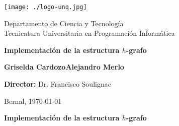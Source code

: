 \documentclass[%
    a4paper,%
    12pt,%
    twoside,%
    openright,%
    halfparskip,%
    cleardoubleempty,%
    bigheadings,%
    titlepage,%
    headsepline%
]{scrbook}
\begin{document}

\frontmatter
\begin{titlepage}


\begin{center}
\texttt{[image: ./logo-unq.jpg]}\\

\medskip

Departamento de Ciencia y Tecnología\\
Tecnicatura Universitaria en Programación Informática\\

\vspace{3cm}

\textbf{\huge Implementación de la estructura $h$-grafo}\\[0.4cm] 

\vspace{1.5cm}

{\large \bf {}Griselda CardozoAlejandro Merlo}

\end{center}

\vspace{3cm}

\textbf{Director:} Dr. Francisco Soulignac

\vspace{5mm}

Bernal, \today
{}
\end{titlepage}


\newpage


\thispagestyle{empty} \cleardoublepage

\thispagestyle{empty}

\vspace*{2cm}

\begin{center}
\Large \textbf{Implementación de la estructura $h$-grafo}
\end{center}

\end{document}
